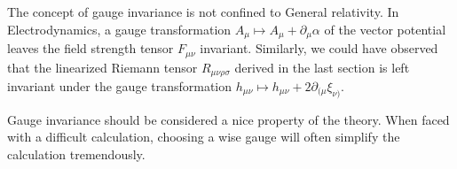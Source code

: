 \documentclass[twoside,utf8]{article}
\begin{document}
The concept of gauge invariance is not confined to General relativity. In Electrodynamics, a gauge transformation $A_\mu \mapsto A_\mu + \partial_\mu \alpha$ of the vector potential leaves the field strength tensor $F_{\mu\nu}$ invariant. Similarly, we could have observed that the linearized Riemann tensor $R_{\mu \nu \rho \sigma}$ derived in the last section is left invariant under the gauge transformation $h_{\mu\nu} \mapsto h_{\mu\nu}+2\partial_{(\mu}\xi_{\nu)}$.

Gauge invariance should be considered a nice property of the theory. When faced with a difficult calculation, choosing a wise gauge will often simplify the calculation tremendously.











\end{document}
